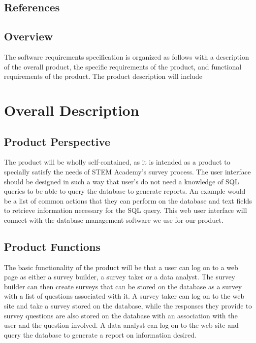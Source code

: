 \documentclass[letterpaper,10pt,titlepage, draftclsnofoot,onecolumn]{IEEEtran}
\begin{document}
\subsection{References}
\subsection{Overview}
The software requirements specification is organized as follows with a description of the overall product, the specific requirements of the
product, and functional requirements of the product. The product description will include %
\section{Overall Description}

\subsection{Product Perspective}
The product will be wholly self-contained, as it is intended as a product to specially satisfy the needs of STEM Academy's survey
process. The user interface should be designed in such a way that user's do not need a knowledge of SQL queries to be able
to query the database to generate reports. An example would be a list of common actions that they can perform on the database
and text fields to retrieve information necessary for the SQL query. This web user interface will connect with the database management
software we use for our product.
\subsection{Product Functions}
The basic functionality of the product will be that a user can log on to a web page as either a survey builder,
a survey taker or a data analyst. The survey builder can then create surveys that can be stored on the database as a survey with a
list of questions associated with it. A survey taker can log on to the web site and take a survey stored on the database,
while the responses they provide to survey questions are also stored on the database with an association with the user
and the question involved. A data analyst can log on to the web site and query the database to generate a report on
information desired.
\end{document}
